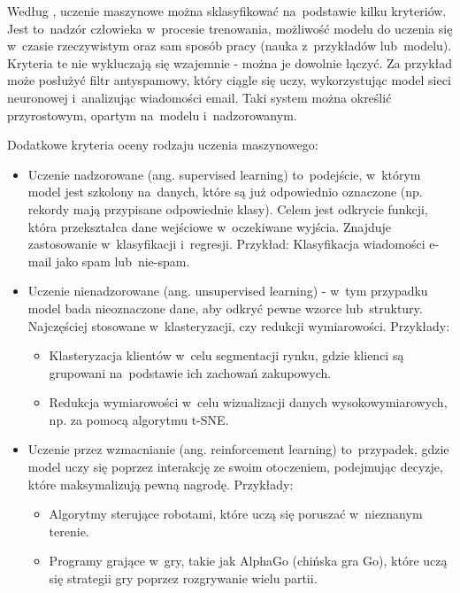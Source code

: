 Według \cite{Geron2020}, uczenie maszynowe można sklasyfikować na~podstawie kilku kryteriów.
Jest to~nadzór człowieka w~procesie trenowania, możliwość modelu do uczenia się w~czasie rzeczywistym
oraz sam sposób pracy (nauka z~przykładów lub~modelu). Kryteria te nie wykluczają się wzajemnie - można je dowolnie łączyć.
Za przykład może posłużyć filtr antyspamowy, który ciągle się uczy,
wykorzystując model sieci neuronowej i~analizując wiadomości email.
Taki system można określić przyrostowym, opartym na~modelu i~nadzorowanym.

Dodatkowe kryteria oceny rodzaju uczenia maszynowego:
\begin{itemize}[label=-,labelsep=0.4cm,leftmargin=0.6cm]
    \item Uczenie nadzorowane (ang. supervised learning) to~podejście, w~którym model jest szkolony na~danych,
        które są już odpowiednio oznaczone (np. rekordy mają przypisane odpowiednie klasy).
        Celem jest odkrycie funkcji, która przekształca dane wejściowe w~oczekiwane wyjścia.
        Znajduje zastosowanie w~klasyfikacji i~regresji.
        Przykład: Klasyfikacja wiadomości e-mail jako spam lub~nie-spam.
    \item Uczenie nienadzorowane (ang. unsupervised learning)
        - w~tym przypadku model bada nieoznaczone dane, aby odkryć pewne wzorce lub~struktury.
        Najczęściej stosowane w~klasteryzacji, czy redukcji wymiarowości. Przykłady:
        \begin{itemize}[label=*,labelsep=0.4cm,leftmargin=0.8cm]
            \item Klasteryzacja klientów w~celu segmentacji rynku, gdzie klienci są grupowani na~podstawie ich zachowań zakupowych. 
            \item Redukcja wymiarowości w~celu wizualizacji danych wysokowymiarowych, np. za pomocą algorytmu t-SNE.
        \end{itemize}
    \item Uczenie przez wzmacnianie (ang. reinforcement learning) to~przypadek,
        gdzie model uczy się poprzez interakcję ze swoim otoczeniem,
        podejmując decyzje, które maksymalizują pewną nagrodę. Przykłady:
        \begin{itemize}[label=*,labelsep=0.4cm,leftmargin=0.8cm]
            \item Algorytmy sterujące robotami, które uczą się poruszać w~nieznanym terenie. 
            \item Programy grające w~gry, takie jak AlphaGo (chińska gra Go), które uczą się strategii gry poprzez rozgrywanie wielu partii.
        \end{itemize}
\end{itemize}
